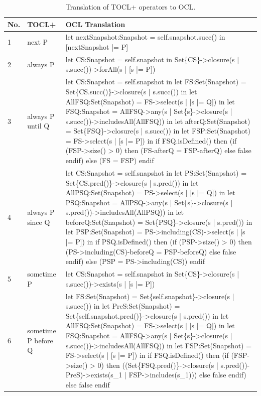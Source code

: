 \begin{table}[htbp]
\caption{Translation of TOCL+ operators to OCL.}
\label{tab:TOCL2OCL}
\begin{tabularx}{\textwidth}{|>{\footnotesize}p{0.8cm}|>{\scriptsize\raggedright\arraybackslash}p{4cm}|>{\scriptsize\raggedright\arraybackslash}X|}
    \hline
    \textbf{No.} & \textbf{TOCL+} & \textbf{OCL Translation} \\
    \hline
    1 & 
    next P &
    let nextSnapshot:Snapshot = self.snapshot.succ() in [nextSnapshot |= P] \\
    \hline
    2 &
    always P &
    let CS:Snapshot = self.snapshot in Set\{CS\}->closure(s | s.succ())->forAll(s | [s |= P]) \\
    \hline  
    3 &
    always P until Q &
    let CS:Snapshot = self.snapshot
    in let FS:Set(Snapshot) = Set\{CS.succ()\}->closure(s | s.succ())
    in let AllFSQ:Set(Snapshot) = FS->select(s | [s |= Q])
    in let FSQ:Snapshot = AllFSQ->any(s | Set\{s\}->closure(s | s.succ())->includesAll(AllFSQ))
    in let afterQ:Set(Snapshot) = Set\{FSQ\}->closure(s | s.succ())
    in let FSP:Set(Snapshot) = FS->select(s | [s |= P])
    in if FSQ.isDefined() then (if (FSP->size() > 0) then (FS-afterQ = FSP-afterQ) else false endif) else (FS = FSP) endif \\
    \hline
    4 &
    always P since Q &
    let CS:Snapshot = self.snapshot
    in let PS:Set(Snapshot) = Set\{CS.pred()\}->closure(s | s.pred())
    in let AllPSQ:Set(Snapshot) = PS->select(s | [s |= Q])
    in let PSQ:Snapshot = AllPSQ->any(s | Set\{s\}->closure(s | s.pred())->includesAll(AllPSQ))
    in let beforeQ:Set(Snapshot) = Set\{PSQ\}->closure(s | s.pred())
    in let PSP:Set(Snapshot) = PS->including(CS)->select(s | [s |= P])
    in if PSQ.isDefined() then (if (PSP->size() > 0) then (PS->including(CS)-beforeQ = PSP-beforeQ) else false endif) else (PSP = PS->including(CS)) endif \\
    \hline
    5 &
    sometime P &
    let CS:Snapshot = self.snapshot in Set\{CS\}->closure(s | s.succ())->exists(s | [s |= P]) \\
    \hline
    6 &
    sometime P before Q &
    let FS:Set(Snapshot) = Set\{self.snapshot\}->closure(s | s.succ())
    in let PreS:Set(Snapshot) = Set\{self.snapshot.pred()\}->closure(s | s.pred())
    in let AllFSQ:Set(Snapshot) = FS->select(s | [s |= Q])
    in let FSQ:Snapshot = AllFSQ->any(s | Set\{s\}->closure(s | s.succ())->includesAll(AllFSQ))
    in let FSP:Set(Snapshot) = FS->select(s | [s |= P])
    in if FSQ.isDefined() then (if (FSP->size() > 0) then ((Set\{FSQ.pred()\}->closure(s | s.pred())-PreS)->exists(s\_1 | FSP->includes(s\_1))) else false endif) else false endif \\

\end{tabularx}
\end{table}
